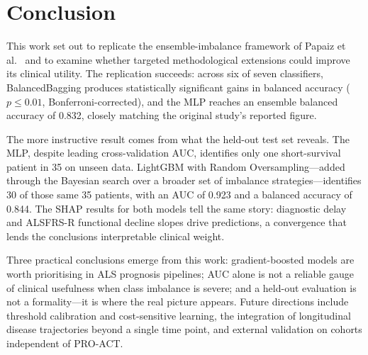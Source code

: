 \documentclass[a4paper,twoside]{article}
\begin{document}
\section{Conclusion}
\label{sec:conclusion}

This work set out to replicate the ensemble-imbalance framework of Papaiz
et al.~\cite{Papaiz2024} and to examine whether targeted methodological
extensions could improve its clinical utility. The replication succeeds: across
six of seven classifiers, BalancedBagging produces statistically significant
gains in balanced accuracy ($p \leq 0.01$, Bonferroni-corrected), and the MLP
reaches an ensemble balanced accuracy of 0.832, closely matching the original
study's reported figure.

The more instructive result comes from what the held-out test set reveals.
The MLP, despite leading cross-validation AUC, identifies only one short-survival
patient in 35 on unseen data. LightGBM with Random Oversampling---added through the Bayesian search over a
broader set of imbalance strategies---identifies 30 of those same 35 patients,
with an AUC of 0.923 and a balanced accuracy of 0.844. The SHAP results for both models tell the same story: diagnostic delay and
ALSFRS-R functional decline slopes drive predictions, a convergence that lends
the conclusions interpretable clinical weight.

Three practical conclusions emerge from this work: gradient-boosted models are
worth prioritising in ALS prognosis pipelines; AUC alone is not a reliable gauge
of clinical usefulness when class imbalance is severe; and a held-out evaluation
is not a formality---it is where the real picture appears. Future directions include threshold
calibration and cost-sensitive learning, the integration of longitudinal
disease trajectories beyond a single time point, and external validation on
cohorts independent of PRO-ACT.



{\small
}
\end{document}
